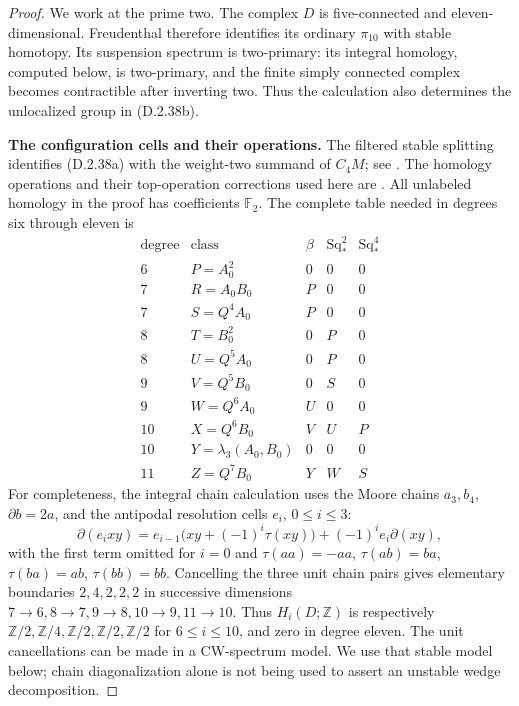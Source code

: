 \begin{proof}
We work at the prime two.  The complex $D$ is five-connected and
eleven-dimensional.  Freudenthal therefore identifies its ordinary
$\pi_{10}$ with stable homotopy.  Its suspension spectrum is
two-primary: its integral homology, computed below, is two-primary,
and the finite simply connected complex becomes contractible
after inverting two.  Thus the calculation also determines the
unlocalized group in \textup{(D.2.38b)}.

\medskip\noindent
\textbf{The configuration cells and their operations.}
The filtered stable splitting identifies \textup{(D.2.38a)}
with the weight-two summand of $C_4M$; see
\cite[Theorem~1.1, p.~577, and Theorem~3.2, p.~580]{Snaith1974}.
The homology operations and their top-operation corrections used
here are \cite[Chapter~III, Theorems~1.2--1.4,
pp.~216--219]{I_CohenLadaMay1976}.  All unlabeled homology in
the proof has coefficients $\mathbb F_2$.
The complete table needed in degrees six through eleven is
\[
\begin{array}{c|c|c|c|c}
\text{degree}&\text{class}&\beta&\operatorname{Sq}_*^2&
 \operatorname{Sq}_*^4\\ \hline
6&P=A_0^2&0&0&0\\
7&R=A_0B_0&P&0&0\\
7&S=Q^4A_0&P&0&0\\
8&T=B_0^2&0&P&0\\
8&U=Q^5A_0&0&P&0\\
9&V=Q^5B_0&0&S&0\\
9&W=Q^6A_0&U&0&0\\
10&X=Q^6B_0&V&U&P\\
10&Y=\lambda_3(A_0,B_0)&0&0&0\\
11&Z=Q^7B_0&Y&W&S
\end{array}
\tag{D.2.38d}
\]
For completeness, the integral chain calculation uses the Moore
chains $a_3,b_4$, $\partial b=2a$, and the antipodal resolution
cells $e_i$, $0\leq i\leq3$:
\[
 \partial(e_i xy)=e_{i-1}\bigl(xy+(-1)^i\tau(xy)\bigr)
                  +(-1)^i e_i\partial(xy),
 \tag{D.2.38e}
\]
with the first term omitted for $i=0$ and
$\tau(aa)=-aa$, $\tau(ab)=ba$, $\tau(ba)=ab$, $\tau(bb)=bb$.
Cancelling the three unit chain pairs gives elementary boundaries
$2,4,2,2,2$ in successive dimensions
$7\to6,8\to7,9\to8,10\to9,11\to10$.
Thus $H_i(D;\mathbb Z)$ is respectively
$\mathbb Z/2,\mathbb Z/4,\mathbb Z/2,\mathbb Z/2,
\mathbb Z/2$ for $6\leq i\leq10$, and zero in degree eleven.
The unit cancellations can be made in a CW-spectrum model.
We use that stable model below; chain diagonalization alone is
not being used to assert an unstable wedge decomposition.


\end{proof}

